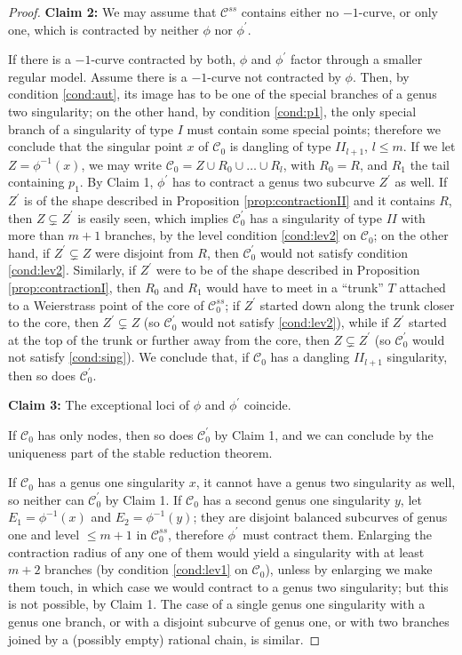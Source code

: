 \documentclass[11pt]{amsart}
\theoremstyle{plain}
\theoremstyle{definition}
\begin{document}
\begin{proof}
 \textbf{Claim 2:} We may assume that $\mathcal C^{ss}$ contains either no $-1$-curve, or only one, which is contracted by neither $\phi$ nor $\phi^\prime$.
 
 \noindent If there is a $-1$-curve contracted by both, $\phi$ and $\phi^\prime$ factor through a smaller regular model. Assume there is a $-1$-curve not contracted by $\phi$. Then, by condition \eqref{cond:aut}, its image has to be one of the special branches of a genus two singularity; on the other hand, by condition \eqref{cond:p1}, the only special branch of a singularity of type $I$ must contain some special points; therefore we conclude that the singular point $x$ of $\mathcal C_0$ is dangling of type $I\!I_{l+1}$, $l\leq m$. If we let $Z=\phi^{-1}(x)$, we may write $\mathcal C_0=Z\cup R_0\cup\ldots\cup R_l$, with $R_0=R$, and $R_1$ the tail containing $p_1$. 
 By Claim 1, $\phi^\prime$ has to contract a genus two subcurve $Z^\prime$ as well. If $Z^\prime$ is of the shape described in Proposition \ref{prop:contractionII} and it contains $R$, then $Z\subsetneq Z^\prime$ is easily seen, which implies $\mathcal C^\prime_0$ has a singularity of type $I\!I$ with more than $m+1$ branches, by the level condition \eqref{cond:lev2} on $\mathcal C_0$; on the other hand, if $Z^\prime\subsetneq Z$ were disjoint from $R$, then $\mathcal C^\prime_0$ would not satisfy condition \eqref{cond:lev2}. Similarly, if $Z^\prime$ were to be of the shape described in Proposition \ref{prop:contractionI}, then $R_0$ and $R_1$ would have to meet in a ``trunk'' $T$ attached to a Weierstrass point of the core of $\mathcal C_0^{ss}$; if $Z^\prime$ started down along the trunk closer to the core, then $Z^\prime\subsetneq Z$ (so $\mathcal C^\prime_0$ would not satisfy \eqref{cond:lev2}), while if $Z^\prime$ started at the top of the trunk or further away from the core, then $Z\subsetneq Z^\prime$ (so $\mathcal C^\prime_0$ would not satisfy \eqref{cond:sing}). We conclude that, if $\mathcal C_0$ has a dangling $I\!I_{l+1}$ singularity, then so does $\mathcal C^\prime_0$.
 
 \textbf{Claim 3:} The exceptional loci of $\phi$ and $\phi^\prime$ coincide.
 
 \noindent If $\mathcal C_0$ has only nodes, then so does $\mathcal C^\prime_0$ by Claim 1, and we can conclude by the uniqueness part of the stable reduction theorem.
 
 If $\mathcal C_0$ has a genus one singularity $x$, it cannot have a genus two singularity as well, so neither can $\mathcal C^\prime_0$ by Claim 1. If $\mathcal C_0$ has a second genus one singularity $y$, let $E_1=\phi^{-1}(x)$ and $E_2=\phi^{-1}(y)$; they are disjoint balanced subcurves of genus one and level $\leq m+1$ in $\mathcal C^{ss}_0$, therefore $\phi^\prime$ must contract them. Enlarging the contraction radius of any one of them would yield a singularity with at least $m+2$ branches (by condition \eqref{cond:lev1} on $\mathcal C_0$), unless by enlarging we make them touch, in which case we would contract to a genus two singularity; but this is not possible, by Claim 1. The case of a single genus one singularity with a genus one branch, or with a disjoint subcurve of genus one, or with two branches joined by a (possibly empty) rational chain, is similar.
 

\end{proof}
\end{document}
